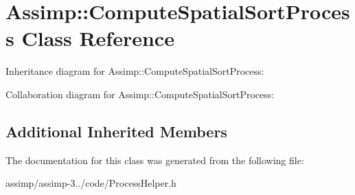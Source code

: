\hypertarget{class_assimp_1_1_compute_spatial_sort_process}{\section{Assimp\+:\+:Compute\+Spatial\+Sort\+Process Class Reference}
\label{class_assimp_1_1_compute_spatial_sort_process}
}


Inheritance diagram for Assimp\+:\+:Compute\+Spatial\+Sort\+Process\+:


Collaboration diagram for Assimp\+:\+:Compute\+Spatial\+Sort\+Process\+:
\subsection*{Additional Inherited Members}


The documentation for this class was generated from the following file\+:\begin{DoxyCompactItemize}
\item 
assimp/assimp-\/3../code/Process\+Helper.\+h\end{DoxyCompactItemize}
